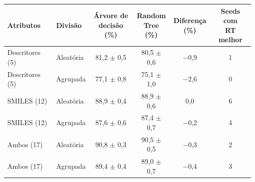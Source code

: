 \begin{tabular}{llcccc}
\toprule
Atributos & Divisão & \shortstack{Árvore de\\decisão (\%)} & \shortstack{Random\\Tree (\%)} & \shortstack{Diferença\\(\%)} & \shortstack{Seeds com\\RT melhor} \\
\midrule
Descritores (5) & Aleatória & 81,2 $\pm$ 0,5 & 80,5 $\pm$ 0,6 & $-$0,9 & 1 \\
Descritores (5) & Agrupada & 77,1 $\pm$ 0,8 & 75,1 $\pm$ 1,0 & $-$2,6 & 0 \\
SMILES (12) & Aleatória & 88,9 $\pm$ 0,4 & 88,9 $\pm$ 0,6 & 0,0 & 6 \\
SMILES (12) & Agrupada & 87,6 $\pm$ 0,6 & 87,4 $\pm$ 0,7 & $-$0,2 & 4 \\
Ambos (17) & Aleatória & 90,8 $\pm$ 0,3 & 90,5 $\pm$ 0,5 & $-$0,3 & 2 \\
Ambos (17) & Agrupada & 89,4 $\pm$ 0,4 & 89,0 $\pm$ 0,7 & $-$0,4 & 3 \\
\bottomrule
\end{tabular}
